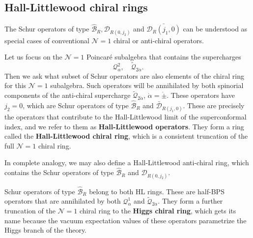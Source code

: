 \documentclass[a4paper,11pt]{article}
\begin{document}
\subsection{Hall-Littlewood chiral rings}
The Schur operators of type $\hat{\mathcal{B}}_R, \mathcal{D}_{R(0,j_2)}$ and $\bar{\mathcal{D}_R(j_1, 0)}$ can be understood as special cases of conventional $\mathcal{N}=1$ chiral or anti-chiral operators.

Let us focus on the $\mathcal{N}=1$ Poincar\'{e} subalgebra that contains the supercharges
\begin{equation}
    \mathcal{Q}_\alpha^2, \quad \widetilde{\mathcal{Q}}_{2 \dot{\alpha}}.
\end{equation}
Then we ask what subset of Schur operators are also elements of the chiral ring for this $\mathcal{N}=1$ subalgebra. Such operators will be annihilated by both spinorial components of the anti-chiral supercharge $\widetilde{\mathcal{Q}}_{2 \dot{\alpha}}$, $\dot{\alpha} = \dot{\pm}$. These operators have $j_2 = 0$, which are Schur operators of type $\hat{\mathcal{B}}_R$ and $\bar{\mathcal{D}}_{R(j_1,0)}$. These are precisely the operators that contribute to the Hall-Littlewood limit of the superconformal index, and we refer to them as \textbf{Hall-Littlewood operators}. They form a ring called the \textbf{Hall-Littlewood chiral ring}, which is a consistent truncation of the full $\mathcal{N}=1$ chiral ring.

In complete analogy, we may also define a Hall-Littlewood anti-chiral ring, which contains the Schur operators of type $\hat{\mathcal{B}}_R$ and $\mathcal{D}_{R(0,j_2)}$.

Schur operators of type $\hat{\mathcal{B}}_R$ belong to both HL rings. These are half-BPS operators that are annihilated by both $\mathcal{Q}_\alpha^1$ and $\widetilde{\mathcal{Q}}_{2\dot{\alpha}}$. They form a further truncation of the $\mathcal{N} = 1$ chiral ring to the \textbf{Higgs chiral ring}, which gets its name because the vacuum expectation values of these operators parametrize the Higgs branch of the theory.
\end{document}
